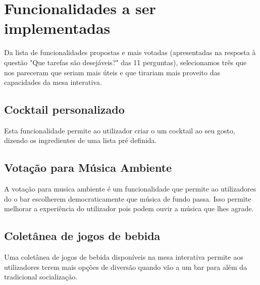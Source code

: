 \documentclass{article}
\begin{document}
\section*{Funcionalidades a ser implementadas}

Da lista de funcionalidades propostas e mais votadas (apresentadas na resposta à questão "Que tarefas são desejáveis?" das 11 perguntas), selecionamos três que nos pareceram que seriam mais úteis e que tirariam mais proveito das capacidades da mesa interativa.

\subsection*{Cocktail personalizado}
Esta funcionalidade permite ao utilizador criar o um cocktail ao seu gosto, dizendo os ingredientes de uma lista pré definida.\\

\subsection*{Votação para Música Ambiente}
A votação para musica ambiente é um funcionalidade que permite ao utilizadores do o bar escolherem democraticamente que música de fundo passa. Isso permite melhorar a experiência do utilizador pois podem ouvir a música que lhes agrade.\\

\subsection*{Coletânea de jogos de bebida}
Uma coletânea de jogos de bebida disponíveis na mesa interativa permite aos utilizadores terem mais opções de diversão quando vão a um bar para além da tradicional socialização.\\
\end{document}
